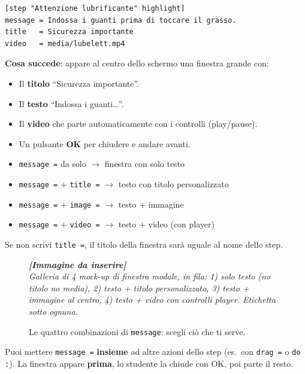 ﻿\documentclass[a4paper,12pt,oneside]{book}
\newcommand{\kw}[1]{\texttt{\color{keycolor}#1}}
\newcommand{\imgph}[2]{%
  \begin{tcolorbox}[colback=cvtlightblue!30,colframe=cvtblue!40,%
    width=#1,halign=center,valign=center,height=5cm,boxrule=0.5pt,arc=3pt]%
    \textcolor{cvtgray}{\itshape\footnotesize\textbf{[Immagine da inserire]}\\[3pt]#2}%
  \end{tcolorbox}}
\begin{document}
\begin{lstlisting}
[step "Attenzione lubrificante" highlight]
message = Indossa i guanti prima di toccare il grasso.
title   = Sicurezza importante
video   = media/lubelett.mp4
\end{lstlisting}

\textbf{Cosa succede}: appare al centro dello schermo una finestra grande con:
\begin{itemize}
  \item Il \textbf{titolo} ``Sicurezza importante''.
  \item Il \textbf{testo} ``Indossa i guanti\ldots''.
  \item Il \textbf{video} che parte automaticamente con i controlli (play/pause).
  \item Un pulsante \textbf{OK} per chiudere e andare avanti.
\end{itemize}

\begin{notablu}
\begin{itemize}
  \item \kw{message =} da solo $\rightarrow$ finestra con solo testo
  \item \kw{message =} + \kw{title =} $\rightarrow$ testo con titolo personalizzato
  \item \kw{message =} + \kw{image =} $\rightarrow$ testo + immagine
  \item \kw{message =} + \kw{video =} $\rightarrow$ testo + video (con player)
\end{itemize}

Se non scrivi \kw{title =}, il titolo della finestra sarà uguale al nome dello
step.
\end{notablu}

\begin{figure}[H]
  \centering
  \imgph{13cm}{Galleria di 4 mock-up di finestra modale, in fila: 1) solo testo (no titolo no media), 2) testo + titolo personalizzato, 3) testo + immagine al centro, 4) testo + video con controlli player. Etichetta sotto ognuna.}
  \caption{Le quattro combinazioni di \kw{message}: scegli ciò che ti serve.}
  \label{fig:modal-varianti}
\end{figure}

\begin{trucchetto}
Puoi mettere \kw{message =} \textbf{insieme} ad altre azioni dello step (es.\ con
\kw{drag =} o \kw{do :}). La finestra appare \textbf{prima}, lo studente la
chiude con OK, poi parte il resto.
\end{trucchetto}
\end{document}

